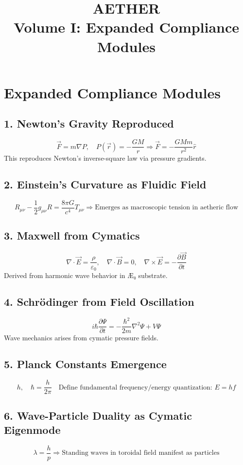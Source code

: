 \documentclass[12pt]{article}
\title{\Huge AETHER \\ \Large Volume I: Expanded Compliance Modules}
\author{}
\date{}
\begin{document}
\maketitle

\section*{Expanded Compliance Modules}

\subsection*{1. Newton’s Gravity Reproduced}
\[
\vec{F} = m \nabla P, \quad P(\vec{r}) = - \frac{G M}{r} \Rightarrow \vec{F} = - \frac{G M m}{r^2} \hat{r}
\]
This reproduces Newton’s inverse-square law via pressure gradients.

\subsection*{2. Einstein’s Curvature as Fluidic Field}
\[
R_{\mu\nu} - \frac{1}{2} g_{\mu\nu} R = \frac{8 \pi G}{c^4} T_{\mu\nu} \Rightarrow \text{Emerges as macroscopic tension in aetheric flow}
\]

\subsection*{3. Maxwell from Cymatics}
\[
\nabla \cdot \vec{E} = \frac{\rho}{\varepsilon_0}, \quad \nabla \cdot \vec{B} = 0, \quad \nabla \times \vec{E} = -\frac{\partial \vec{B}}{\partial t}
\]
Derived from harmonic wave behavior in Æ₀ substrate.

\subsection*{4. Schrödinger from Field Oscillation}
\[
i \hbar \frac{\partial \Psi}{\partial t} = -\frac{\hbar^2}{2m} \nabla^2 \Psi + V \Psi
\]
Wave mechanics arises from cymatic pressure fields.

\subsection*{5. Planck Constants Emergence}
\[
h, \quad \hbar = \frac{h}{2\pi} \quad \text{Define fundamental frequency/energy quantization: } E = hf
\]

\subsection*{6. Wave-Particle Duality as Cymatic Eigenmode}
\[
\lambda = \frac{h}{p} \Rightarrow \text{Standing waves in toroidal field manifest as particles}
\]
\end{document}
